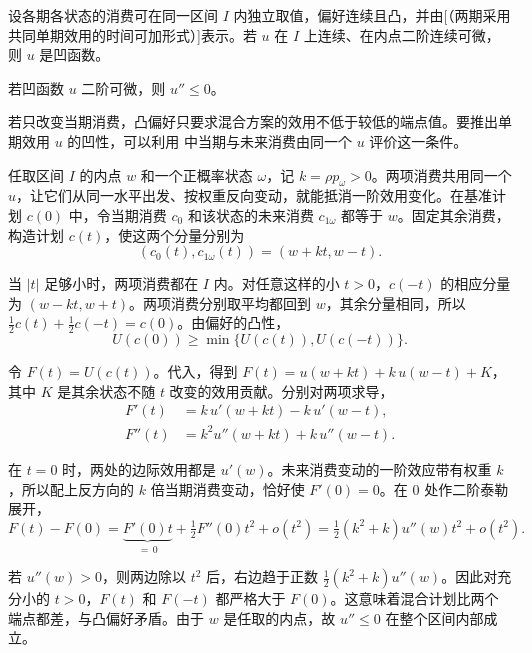 \begin{tcolorbox}[knowledge]
 设各期各状态的消费可在同一区间 $I$ 内独立取值，偏好连续且凸，并由[（两期采用共同单期效用的时间可加形式）]表示。若 $u$ 在 $I$ 上连续、在内点二阶连续可微，则 $u$ 是凹函数。

 若凹函数 $u$ 二阶可微，则 $u''\le 0$。
\end{tcolorbox}

\begin{solution}[label-content={证明（\WJRef{thm:wj-seven-1}{定理~}[（凸偏好与单期效用的凹性）]）},blank-type=none]
若只改变当期消费，凸偏好只要求混合方案的效用不低于较低的端点值。要推出单期效用 $u$ 的凹性，可以利用 中当期与未来消费由同一个 $u$ 评价这一条件。

任取区间 $I$ 的内点 $w$ 和一个正概率状态 $\omega$，记 $k=\rho p_\omega>0$。两项消费共用同一个 $u$，让它们从同一水平出发、按权重反向变动，就能抵消一阶效用变化。在基准计划 $c(0)$ 中，令当期消费 $c_0$ 和该状态的未来消费 $c_{1\omega}$ 都等于 $w$。固定其余消费，构造计划 $c(t)$，使这两个分量分别为
\[
 (c_0(t),c_{1\omega}(t))=(w+kt,w-t).
\]

当 $|t|$ 足够小时，两项消费都在 $I$ 内。对任意这样的小 $t>0$，$c(-t)$ 的相应分量为 $(w-kt,w+t)$。两项消费分别取平均都回到 $w$，其余分量相同，所以 $\tfrac12c(t)+\tfrac12c(-t)=c(0)$。由偏好的凸性，
\[
 U(c(0))\ge \min\{U(c(t)),U(c(-t))\}.
\]

令 $F(t)=U(c(t))$。代入，得到 $F(t)=u(w+kt)+k\,u(w-t)+K$，其中 $K$ 是其余状态不随 $t$ 改变的效用贡献。分别对两项求导，
\[
 \begin{aligned}
 F'(t)&=k\,u'(w+kt)-k\,u'(w-t),\\
 F''(t)&=k^2u''(w+kt)+k\,u''(w-t).
 \end{aligned}
\]

在 $t=0$ 时，两处的边际效用都是 $u'(w)$。未来消费变动的一阶效应带有权重 $k$，所以配上反方向的 $k$ 倍当期消费变动，恰好使 $F'(0)=0$。在 $0$ 处作二阶泰勒展开，
\[
 F(t)-F(0)
 =\underbrace{F'(0)t}_{=\,0}
  +\tfrac12 F''(0)t^2+o(t^2)
 =\tfrac12(k^2+k)u''(w)t^2+o(t^2).
\]

若 $u''(w)>0$，则两边除以 $t^2$ 后，右边趋于正数 $\tfrac12(k^2+k)u''(w)$。因此对充分小的 $t>0$，$F(t)$ 和 $F(-t)$ 都严格大于 $F(0)$。这意味着混合计划比两个端点都差，与凸偏好矛盾。由于 $w$ 是任取的内点，故 $u''\le 0$ 在整个区间内部成立。


\end{solution}
